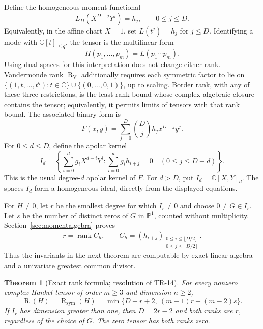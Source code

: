 \documentclass[11pt]{article}
\newtheorem{theorem}{Theorem}[section]
\theoremstyle{definition}
\theoremstyle{remark}
\newcommand{\C}{\mathbb C}
\newcommand{\Rk}{\operatorname{R}}
\newcommand{\SR}{\operatorname{R}_{\mathrm{sym}}}
\newcommand{\VR}{\operatorname{R}_{\mathrm V}}
\newcommand{\rank}{\operatorname{rank}}
\newcommand{\Pq}{\C[t]_{\le q}}
\begin{document}
Define the homogeneous moment functional
\[
 L_D(X^{D-j}Y^j)=h_j,\qquad 0\le j\le D.
\]
Equivalently, in the affine chart $X=1$, set $L(t^j)=h_j$ for $j\le D$.
Identifying a mode with $\Pq$, the tensor is the multilinear form
\begin{equation}\label{eq:moment}
 H(p_1,\ldots,p_m)=L(p_1\cdots p_m).
\end{equation}
Using dual spaces for this interpretation does not change either rank.
Vandermonde rank $\VR$ additionally requires each symmetric factor to lie on
$\{(1,t,\ldots,t^q):t\in\C\}\cup\{(0,\ldots,0,1)\}$, up to scaling.
Border rank, with any of these three restrictions, is the least rank bound
whose complex algebraic closure contains the tensor; equivalently, it permits
limits of tensors with that rank bound.
The associated binary form is
\[
 F(x,y)=\sum_{j=0}^D\binom Dj h_j x^{D-j}y^j.
\]
For $0\le d\le D$, define the apolar kernel
\begin{equation}\label{eq:apolarkernel}
 I_d=\left\{\sum_{i=0}^d g_iX^{d-i}Y^i:
              \sum_{i=0}^d g_i h_{i+j}=0\quad(0\le j\le D-d)\right\}.
\end{equation}
This is the usual degree-$d$ apolar kernel of $F$.
For $d>D$, put $I_d=\C[X,Y]_d$.
The spaces $I_d$ form a homogeneous ideal, directly from the displayed equations.

For $H\ne0$, let $r$ be the smallest degree for which $I_r\ne0$ and choose
$0\ne G\in I_r$. Let $s$ be the number of distinct zeros of $G$ in $\mathbb P^1$,
counted without multiplicity. Section~\ref{sec:momentalgebra} proves
\begin{equation}\label{eq:middle}
 r=\rank C_h,\qquad
 C_h=(h_{i+j})_{\substack{0\le i\le\lfloor D/2\rfloor\\
                         0\le j\le\lceil D/2\rceil}}.
\end{equation}
Thus the invariants in the next theorem are computable by exact linear algebra
and a univariate greatest common divisor.

\begin{theorem}[Exact rank formula; resolution of TR-14]\label{thm:main}
For every nonzero complex Hankel tensor of order $m\ge3$ and dimension $n\ge2$,
\begin{equation}\label{eq:main}
 \boxed{\displaystyle
 \Rk(H)=\SR(H)=
 \min\bigl\{D-r+2,\ (m-1)r-(m-2)s\bigr\}.}
\end{equation}
If $I_r$ has dimension greater than one, then $D=2r-2$ and both ranks are $r$,
regardless of the choice of $G$. The zero tensor has both ranks zero.
\end{theorem}
\end{document}

